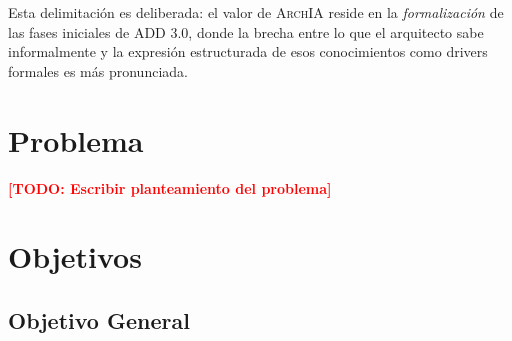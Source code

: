 \documentclass[12pt, letterpaper, oneside]{article}
\newcommand{\archia}{\textsc{ArchIA}}
\newcommand{\TODO}[1]{\textcolor{red}{\textbf{[TODO: #1]}}}
\begin{document}
Esta delimitación es deliberada: el valor de \archia{} reside en la
\emph{formalización} de las fases iniciales de ADD 3.0, donde la brecha entre
lo que el arquitecto sabe informalmente y la expresión estructurada de esos
conocimientos como drivers formales es más pronunciada.


\section{Problema}
\label{sec:problema}


\TODO{Escribir planteamiento del problema}


\section{Objetivos}
\label{sec:objetivos}

\subsection{Objetivo General}
\label{subsec:objetivo-general}

\end{document}
